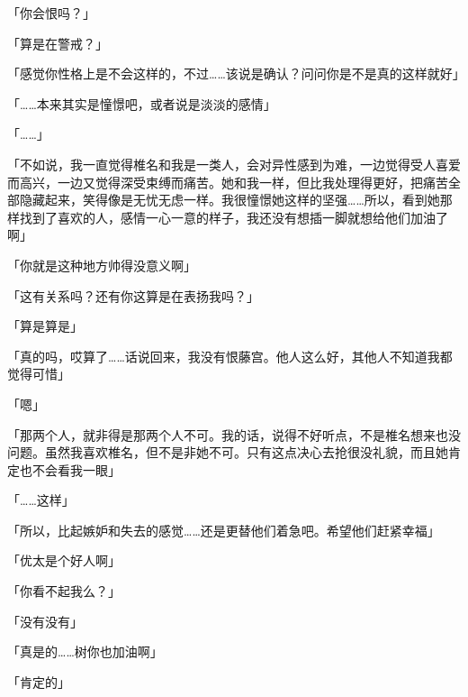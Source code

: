 「你会恨吗？」

「算是在警戒？」

「感觉你性格上是不会这样的，不过……该说是确认？问问你是不是真的这样就好」

「……本来其实是憧憬吧，或者说是淡淡的感情」

「……」

「不如说，我一直觉得椎名和我是一类人，会对异性感到为难，一边觉得受人喜爱而高兴，一边又觉得深受束缚而痛苦。她和我一样，但比我处理得更好，把痛苦全部隐藏起来，笑得像是无忧无虑一样。我很憧憬她这样的坚强……所以，看到她那样找到了喜欢的人，感情一心一意的样子，我还没有想插一脚就想给他们加油了啊」

「你就是这种地方帅得没意义啊」

「这有关系吗？还有你这算是在表扬我吗？」

「算是算是」

「真的吗，哎算了……话说回来，我没有恨藤宫。他人这么好，其他人不知道我都觉得可惜」

「嗯」

「那两个人，就非得是那两个人不可。我的话，说得不好听点，不是椎名想来也没问题。虽然我喜欢椎名，但不是非她不可。只有这点决心去抢很没礼貌，而且她肯定也不会看我一眼」

「……这样」

「所以，比起嫉妒和失去的感觉……还是更替他们着急吧。希望他们赶紧幸福」

「优太是个好人啊」

「你看不起我么？」

「没有没有」

「真是的……树你也加油啊」

「肯定的」

